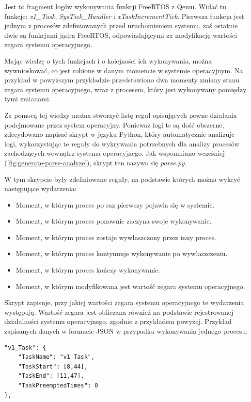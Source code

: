 \documentclass[../../main]{subfiles}
\begin{document}
Jest to fragment logów wykonywania funkcji FreeRTOS z Qemu. Widać tu funkcje: \textit{v1\_Task}, \textit{SysTick\_Handler} i \textit{xTaskIncrementTick}. Pierwsza funkcja jest jednym z procesów zdefiniowanych przed uruchomieniem systemu, zaś ostatnie dwie są funkcjami jądra FreeRTOS, odpowiadającymi za modyfikację wartości zegara systemu operacyjnego.

Mając wiedzę o tych funkcjach i o kolejności ich wykonywania, można wywnioskować, co jest robione w danym momencie w systemie operacyjnym. Na przykład w powyższym przykładzie przedstawiono dwa momenty zmiany stanu zegara systemu operacyjnego, wraz z procesem, który jest wykonywany pomiędzy tymi zmianami.

Za pomocą tej wiedzy można stworzyć listę reguł opisujących pewne działania podejmowane przez system operacyjny. Ponieważ logi te są dość obszerne, zdecydowano napisać skrypt w języku Python, który automatycznie analizuje logi, wykorzystując te reguły do wykrywania potrzebnych dla analizy procesów zachodzących wewnątrz systemu operacyjnego. Jak wspomniano wcześniej (\cref{fig:generate-parse-analyze}), skrypt ten nazywa się \textit{parse.py}.

W tym skrypcie były zdefiniowane reguły, na podstawie których można wykryć następujące wydarzenia:

\begin{itemize}
    \item Moment, w którym proces po raz pierwszy pojawia się w systemie.
    \item Moment, w którym proces ponownie zaczyna swoje wykonywanie.
    \item Moment, w którym proces zostaje wywłaszczony przez inny proces.
    \item Moment, w którym proces kontynuuje wykonywanie po wywłaszczeniu.
    \item Moment, w którym proces kończy wykonywanie.
    \item Moment, w którym modyfikowana jest wartość zegara systemu operacyjnego.
\end{itemize}

Skrypt zapisuje, przy jakiej wartości zegara systemu operacyjnego te wydarzenia występują. Wartość zegara jest obliczana również na podstawie rejestrowanej działalności systemu operacyjnego, zgodnie z przykładem powyżej. Przykład zapisanych danych w formacie JSON w przypadku wykonywania jednego procesu:

\begin{lstlisting}[caption={Przykładowe pomiary dla jednego procesu}, label={lst:example-process-measurements}]
"v1_Task": {
    "TaskName": "v1_Task",
    "TaskStart": [8,44],
    "TaskEnd": [11,47],
    "TaskPreemptedTimes": 0
},
\end{lstlisting}
\end{document}
